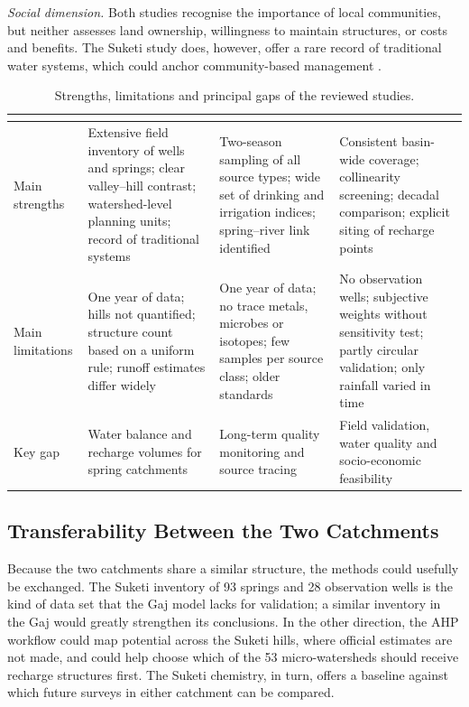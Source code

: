 \documentclass[10pt,a4paper,twocolumn]{article}
\begin{document}
\textit{Social dimension.} Both studies recognise the importance of local communities, but
neither assesses land ownership, willingness to maintain structures, or costs and benefits.
The Suketi study does, however, offer a rare record of traditional water systems, which could
anchor community-based management \citep{sharma2009}.

\begin{table}[t]
\centering
\caption{Strengths, limitations and principal gaps of the reviewed studies.}
\label{tab:appraisal}
\small
\begin{tabularx}{\textwidth}{@{}P{2.6cm}LLL@{}}
\toprule
& \textbf{\citet{pophare2015}} & \textbf{\citet{pophare2018}} & \textbf{\citet{sharma2025}}\\
\midrule
Main strengths & Extensive field inventory of wells and springs; clear valley--hill contrast; watershed-level planning units; record of traditional systems & Two-season sampling of all source types; wide set of drinking and irrigation indices; spring--river link identified & Consistent basin-wide coverage; collinearity screening; decadal comparison; explicit siting of recharge points\\
Main limitations & One year of data; hills not quantified; structure count based on a uniform rule; runoff estimates differ widely & One year of data; no trace metals, microbes or isotopes; few samples per source class; older standards & No observation wells; subjective weights without sensitivity test; partly circular validation; only rainfall varied in time\\
Key gap & Water balance and recharge volumes for spring catchments & Long-term quality monitoring and source tracing & Field validation, water quality and socio-economic feasibility\\
\bottomrule
\end{tabularx}
\end{table}

\subsection{Transferability Between the Two Catchments}

Because the two catchments share a similar structure, the methods could usefully be exchanged.
The Suketi inventory of 93 springs and 28 observation wells is the kind of data set that the Gaj
model lacks for validation; a similar inventory in the Gaj would greatly strengthen its
conclusions. In the other direction, the AHP workflow could map potential across the Suketi
hills, where official estimates are not made, and could help choose which of the 53
micro-watersheds should receive recharge structures first. The Suketi chemistry, in turn,
offers a baseline against which future surveys in either catchment can be compared.
\end{document}
